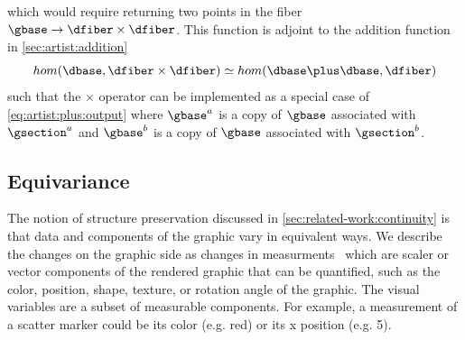 \documentclass[10pt,journal,compsoc]{IEEEtran}
\theoremstyle{definition}
\theoremstyle{remark}
\begin{document}
which would require returning two points in the fiber $\gbase \rightarrow \dfiber \times \dfiber$. This function is adjoint to the addition function in \autoref{sec:artist:addition} 
\begin{equation}
  hom(\dbase, \dfiber\times \dfiber) \simeq hom(\dbase \plus \dbase, \dfiber)
\end{equation}
such that the $\times$ operator can be implemented as a special case of \autoref{eq:artist:plus:output} where $\gbase^a$ is a copy of $\gbase$ associated with $\gsection^a$ and $\gbase^b$ is a copy of $\gbase$ associated with $\gsection^{b}$.



\subsection{Equivariance}
The notion of structure preservation discussed in \autoref{sec:related-work:continuity} is that data and components of the graphic vary in equivalent ways. We describe the changes on the graphic side as changes in measurments \measure\, which are scaler or vector components of the rendered graphic that can be quantified, such as the color, position, shape, texture, or rotation angle of the graphic. The visual variables \cite{bertinIIPropertiesGraphic2011} are a subset of measurable components. For example, a measurement of a scatter marker could be its color (e.g. red) or its x position (e.g. 5). 
\end{document}
